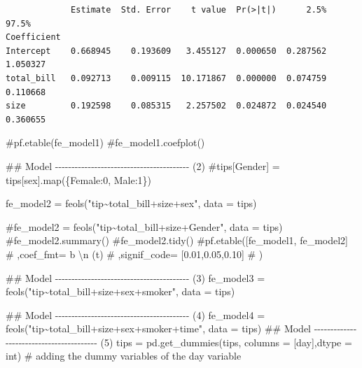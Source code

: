\documentclass[
  letterpaper,
  DIV=11,
  numbers=noendperiod]{scrreprt}
\newenvironment{Shaded}{\begin{snugshade}}{\end{snugshade}}
\newcommand{\BuiltInTok}[1]{\textcolor[rgb]{0.00,0.23,0.31}{#1}}
\newcommand{\CommentTok}[1]{\textcolor[rgb]{0.37,0.37,0.37}{#1}}
\newcommand{\NormalTok}[1]{\textcolor[rgb]{0.00,0.23,0.31}{#1}}
\newcommand{\OperatorTok}[1]{\textcolor[rgb]{0.37,0.37,0.37}{#1}}
\newcommand{\StringTok}[1]{\textcolor[rgb]{0.13,0.47,0.30}{#1}}
\begin{document}
\begin{verbatim}
             Estimate  Std. Error    t value  Pr(>|t|)      2.5%     97.5%
Coefficient                                                               
Intercept    0.668945    0.193609   3.455127  0.000650  0.287562  1.050327
total_bill   0.092713    0.009115  10.171867  0.000000  0.074759  0.110668
size         0.192598    0.085315   2.257502  0.024872  0.024540  0.360655
\end{verbatim}

\begin{Shaded}
\begin{Highlighting}[]
\CommentTok{\#pf.etable(fe\_model1)}
\CommentTok{\#fe\_model1.coefplot()}

\CommentTok{\#\# Model {-}{-}{-}{-}{-}{-}{-}{-}{-}{-}{-}{-}{-}{-}{-}{-}{-}{-}{-}{-}{-}{-}{-}{-}{-}{-}{-}{-}{-}{-}{-}{-}{-}{-}{-}{-}{-}{-}{-}{-}{-} (2)}
\CommentTok{\#tips[\textquotesingle{}Gender\textquotesingle{}] = tips[\textquotesingle{}sex\textquotesingle{}].map(\{\textquotesingle{}Female\textquotesingle{}:0, \textquotesingle{}Male\textquotesingle{}:1\})}

\NormalTok{fe\_model2 }\OperatorTok{=}\NormalTok{ feols(}\StringTok{"tip\textasciitilde{}total\_bill+size+sex"}\NormalTok{, data }\OperatorTok{=}\NormalTok{ tips)}

\CommentTok{\#fe\_model2 = feols("tip\textasciitilde{}total\_bill+size+Gender", data = tips)}
\CommentTok{\#fe\_model2.summary()}
\CommentTok{\#fe\_model2.tidy()}
\CommentTok{\#pf.etable([fe\_model1, fe\_model2]}
\CommentTok{\#          ,coef\_fmt= \textquotesingle{}b \textbackslash{}n (t)\textquotesingle{}}
\CommentTok{\#          ,signif\_code= [0.01,0.05,0.10]}
\CommentTok{\#        )}

\CommentTok{\#\# Model {-}{-}{-}{-}{-}{-}{-}{-}{-}{-}{-}{-}{-}{-}{-}{-}{-}{-}{-}{-}{-}{-}{-}{-}{-}{-}{-}{-}{-}{-}{-}{-}{-}{-}{-}{-}{-}{-}{-}{-}{-} (3)}
\NormalTok{fe\_model3 }\OperatorTok{=}\NormalTok{ feols(}\StringTok{"tip\textasciitilde{}total\_bill+size+sex+smoker"}\NormalTok{, data }\OperatorTok{=}\NormalTok{ tips)}

\CommentTok{\#\# Model {-}{-}{-}{-}{-}{-}{-}{-}{-}{-}{-}{-}{-}{-}{-}{-}{-}{-}{-}{-}{-}{-}{-}{-}{-}{-}{-}{-}{-}{-}{-}{-}{-}{-}{-}{-}{-}{-}{-}{-}{-} (4)}
\NormalTok{fe\_model4 }\OperatorTok{=}\NormalTok{ feols(}\StringTok{"tip\textasciitilde{}total\_bill+size+sex+smoker+time"}\NormalTok{, data }\OperatorTok{=}\NormalTok{ tips)}
\CommentTok{\#\# Model {-}{-}{-}{-}{-}{-}{-}{-}{-}{-}{-}{-}{-}{-}{-}{-}{-}{-}{-}{-}{-}{-}{-}{-}{-}{-}{-}{-}{-}{-}{-}{-}{-}{-}{-}{-}{-}{-}{-}{-}{-} (5)}
\NormalTok{tips }\OperatorTok{=}\NormalTok{ pd.get\_dummies(tips, columns }\OperatorTok{=}\NormalTok{ [}\StringTok{\textquotesingle{}day\textquotesingle{}}\NormalTok{],dtype }\OperatorTok{=} \BuiltInTok{int}\NormalTok{) }\CommentTok{\# adding the dummy variables of the day variable}


\end{Highlighting}
\end{Shaded}
\end{document}
